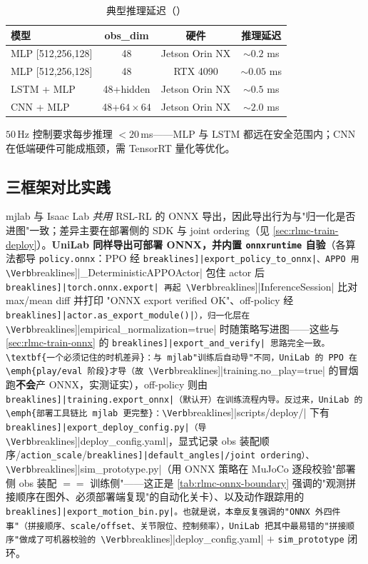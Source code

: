 \begin{table}[H]
\centering
\caption{典型推理延迟（）}
\label{tab:rlmc-onnx-latency}
\begin{tabular}{lccc}
\hline
模型 & obs\_dim & 硬件 & 推理延迟 \\
\hline
MLP [512,256,128] & 48 & Jetson Orin NX & $\sim0.2$ ms \\
MLP [512,256,128] & 48 & RTX 4090 & $\sim0.05$ ms \\
LSTM + MLP & 48+hidden & Jetson Orin NX & $\sim0.5$ ms \\
CNN + MLP & 48+$64{\times}64$ & Jetson Orin NX & $\sim2.0$ ms \\
\hline
\end{tabular}
\end{table}

$50\,$Hz 控制要求每步推理 $<20\,$ms——MLP 与 LSTM 都远在安全范围内；CNN 在低端硬件可能成瓶颈，需 TensorRT 量化等优化。

\subsection{三框架对比实践}

mjlab 与 Isaac Lab \emph{共用} RSL-RL 的 ONNX 导出，因此导出行为与"归一化是否进图"一致；差异主要在部署侧的 SDK 与 joint ordering（见 \cref{sec:rlmc-train-deploy}）。\textbf{UniLab 同样导出可部署 ONNX，并内置 \texttt{onnxruntime} 自验}（各算法都导 \verb|policy.onnx|：PPO 经 \Verb[breaklines]|export_policy_to_onnx|、APPO 用 \Verb[breaklines]|_DeterministicAPPOActor| 包住 actor 后 \Verb[breaklines]|torch.onnx.export| 再起 \Verb[breaklines]|InferenceSession| 比对 max/mean diff 并打印 "ONNX export verified OK"、off-policy 经 \Verb[breaklines]|actor.as_export_module()|），归一化层在 \Verb[breaklines]|empirical_normalization=true| 时随策略写进图——这些与 \cref{sec:rlmc-train-onnx} 的 \Verb[breaklines]|export_and_verify| 思路完全一致。\textbf{一个必须记住的时机差异}：与 mjlab"训练后自动导"不同，UniLab 的 PPO 在 \emph{play/eval 阶段}才导（故 \Verb[breaklines]|training.no_play=true| 的冒烟跑\textbf{不会}产 ONNX，实测证实），off-policy 则由 \Verb[breaklines]|training.export_onnx|（默认开）在训练流程内导。反过来，UniLab 的\emph{部署工具链比 mjlab 更完整}：\Verb[breaklines]|scripts/deploy/| 下有 \Verb[breaklines]|export_deploy_config.py|（导 \Verb[breaklines]|deploy_config.yaml|，显式记录 obs 装配顺序/\verb|action_scale|/\allowbreak\Verb[breaklines]|default_angles|/joint ordering）、\Verb[breaklines]|sim_prototype.py|（用 ONNX 策略在 MuJoCo 逐段校验"部署侧 obs 装配 $==$ 训练侧"——这正是 \cref{tab:rlmc-onnx-boundary} 强调的"观测拼接顺序在图外、必须部署端复现"的自动化关卡）、以及动作跟踪用的 \Verb[breaklines]|export_motion_bin.py|。也就是说，本章反复强调的"ONNX 外四件事"（拼接顺序、scale/offset、关节限位、控制频率），UniLab 把其中最易错的"拼接顺序"做成了可机器校验的 \Verb[breaklines]|deploy_config.yaml| $+$ \verb|sim_prototype| 闭环。

